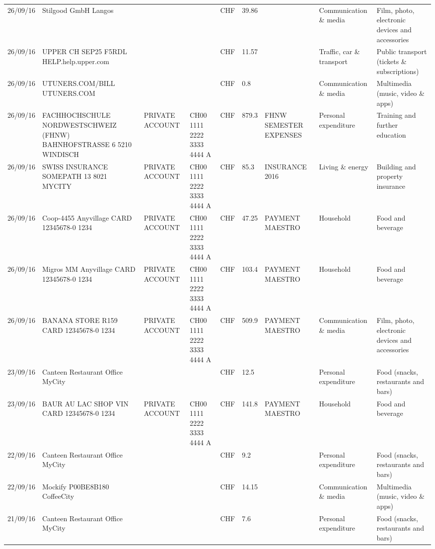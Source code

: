 \begin{landscape}
\begin{adjustwidth}{-2cm}{-2cm}
\begin{tiny}
\begin{longtable}{lp{4cm}llllp{3cm}ll}
		26/09/16 & Stilgood GmbH             Langos &       &       & CHF   & 39.86 &       & Communication \& media & Film, photo, electronic devices and accessories \\
		26/09/16 & UPPER CH SEP25 F5RDL HELP.help.upper.com &       &       & CHF   & 11.57 &       & Traffic, car \& transport & Public transport (tickets \& subscriptions) \\
		26/09/16 & UTUNERS.COM/BILL          UTUNERS.COM &       &       & CHF   & 0.8   &       & Communication \& media & Multimedia (music, video \& apps) \\
		26/09/16 & FACHHOCHSCHULE NORDWESTSCHWEIZ (FHNW) BAHNHOFSTRASSE 6 5210 WINDISCH & PRIVATE ACCOUNT & CH00 1111 2222 3333 4444 A & CHF   & 879.3 & FHNW SEMESTER EXPENSES & Personal expenditure & Training and further education \\
		26/09/16 & SWISS INSURANCE SOMEPATH 13 8021 MYCITY & PRIVATE ACCOUNT & CH00 1111 2222 3333 4444 A & CHF   & 85.3  & INSURANCE 2016 & Living \& energy & Building and property insurance \\
		26/09/16 & Coop-4455 Anyvillage CARD 12345678-0 1234 & PRIVATE ACCOUNT & CH00 1111 2222 3333 4444 A & CHF   & 47.25 & PAYMENT MAESTRO & Household & Food and beverage \\
		26/09/16 & Migros MM Anyvillage CARD 12345678-0 1234 & PRIVATE ACCOUNT & CH00 1111 2222 3333 4444 A & CHF   & 103.4 & PAYMENT MAESTRO & Household & Food and beverage \\
		26/09/16 & BANANA STORE R159 CARD 12345678-0 1234 & PRIVATE ACCOUNT & CH00 1111 2222 3333 4444 A & CHF   & 509.9 & PAYMENT MAESTRO & Communication \& media & Film, photo, electronic devices and accessories \\
		23/09/16 & Canteen Restaurant Office      MyCity &       &       & CHF   & 12.5  &       & Personal expenditure & Food (snacks, restaurants and bars) \\
		23/09/16 & BAUR AU LAC SHOP VIN CARD 12345678-0 1234 & PRIVATE ACCOUNT & CH00 1111 2222 3333 4444 A & CHF   & 141.8 & PAYMENT MAESTRO & Household & Food and beverage \\
		22/09/16 & Canteen Restaurant Office      MyCity &       &       & CHF   & 9.2   &       & Personal expenditure & Food (snacks, restaurants and bars) \\
		22/09/16 & Mockify P00BE8B180       CoffeeCity &       &       & CHF   & 14.15 &       & Communication \& media & Multimedia (music, video \& apps) \\
		21/09/16 & Canteen Restaurant Office      MyCity &       &       & CHF   & 7.6   &       & Personal expenditure & Food (snacks, restaurants and bars) \\

\end{longtable}
\end{tiny}
\end{adjustwidth}
\end{landscape}
